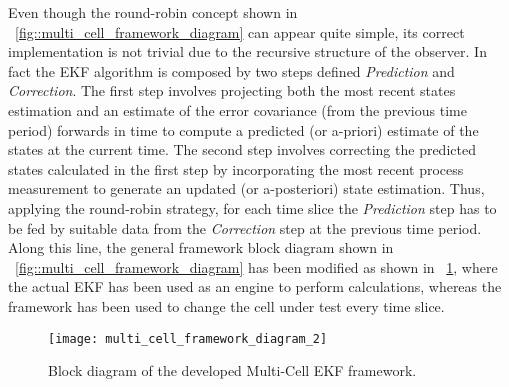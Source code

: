 \documentclass[journal]{IEEEtran}
\begin{document}
Even though the round-robin concept shown in \figurename~\ref{fig::multi_cell_framework_diagram} can appear quite simple, its correct implementation is not trivial due to the recursive structure of the observer. 
In fact the EKF algorithm is composed by two steps defined \textit{Prediction} and \textit{Correction}.
The first step involves projecting both the most recent states estimation and an estimate of the error covariance (from the previous time period) forwards in time to compute a predicted (or a-priori) estimate of the states at the current time. The second step involves correcting the predicted states calculated in the first step by incorporating the most recent process measurement to generate an updated (or a-posteriori) state estimation.
Thus, applying the round-robin strategy, for each time slice the 
\textit{Prediction} step has to be fed by suitable data from the  \textit{Correction} step at the previous time period. 
Along this line, the general framework block diagram shown in \figurename~\ref{fig::multi_cell_framework_diagram} has been modified as shown in \figurename~\ref{fig::multi_cell_framework_diagram_2}, where the actual EKF has been used as an engine to perform calculations, whereas the framework has been used to change the cell under test every time slice.
\begin{figure}[!htbp]
	\centering
		\texttt{[image: multi\_cell\_framework\_diagram\_2]}
	\caption{Block diagram of the developed Multi-Cell EKF framework.}
	\label{fig::multi_cell_framework_diagram_2}
\end{figure}
\end{document}

